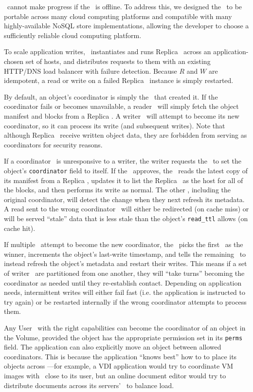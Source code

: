 \Syndicate\ cannot make progress if the \MS\ is offline.
To address this, we designed the \MS\ to be portable across 
many cloud computing platforms and compatible with many highly-available 
NoSQL store implementations, allowing the developer to choose a sufficiently
reliable cloud computing platform.

To scale application writes, \Syndicate\ instantiates and runs Replica
\SGs\ across an application-chosen set of hosts, and distributes requests
to them with an existing HTTP/DNS load balancer with failure detection.
Because $R$ and $W$ are idempotent, a read or write on a failed Replica \SG\ instance
is simply restarted.

By default, an object's coordinator is simply the \SG\ that created it.
If the coordinator fails or becomes unavailable, a reader 
\SG\ will simply fetch the object manifest and blocks from a Replica \SG.  A 
writer \SG\ will attempt to become its new coordinator, so it can process 
its write (and subsequent writes).  Note that although Replica \SGs\ receive
written object data, they are forbidden from serving as coordinators for security reasons.

If a coordinator \SG\ is unresponsive to a writer, the writer
requests the \MS\ to set the object's {\tt coordinator} field to itself.
If the \MS\ approves, the \SG\ reads the latest copy of its manifest from a Replica \SG, updates
it to list the Replica \SG\ as the host for all of the blocks,
and then performs its write as normal.  The other \SGs, including the original
coordinator, will detect the change when they next refresh its metadata.
A read sent to the wrong coordinator \SG\ will either be redirected (on cache miss)
or will be served ``stale'' data that is less stale than the object's {\tt read\_ttl} allows
(on cache hit).

If multiple \SGs\ attempt to become the new coordinator, the \MS\
picks the first \SG\ as the winner, increments the object's last-write timestamp,
and tells the remaining \SGs\ to instead
refresh the object's metadata and restart their writes.  This means
if a set of writer \SGs\ are partitioned from one another, they will ``take turns''
becoming the coordinator as needed until they re-establish contact.
Depending on application needs, intermittent writes will either fail fast (i.e. the 
application is instructed to try again) or be restarted internally if 
the wrong coordinator attempts to process them.

Any User \SG\ with the right capabilities can become the coordinator of an
object in the Volume, provided the object has the appropriate permission  
set in its {\tt perms} field.  The application can also explicitly 
move an object between allowed coordinators.
This is because the application ``knows best'' how to  
to place its objects across \SGs---for example, a VDI application
would try to coordinate VM images with \SGs\ close
to its user, but an online document editor would try to distribute
documents across its servers' \SGs\ to balance load.

